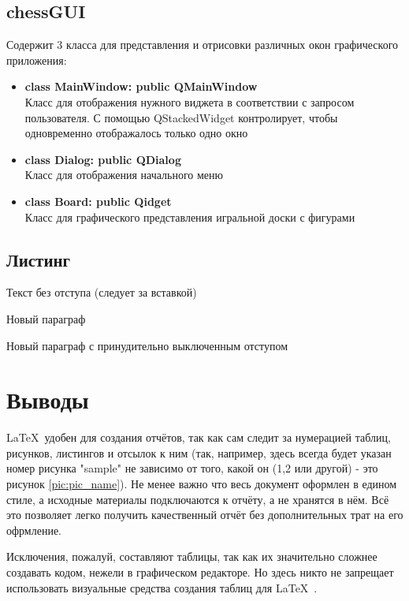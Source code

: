 \subsection*{chessGUI}
Содержит 3 класса для представления и отрисовки различных окон графического приложения:
\begin{itemize}
\item\textbf{class MainWindow: public QMainWindow}\\
Класс для отображения нужного виджета в соответствии с запросом пользователя. С помощью QStackedWidget контролирует, чтобы одновременно отображалось только одно окно\\
\item\textbf{class Dialog: public QDialog}\\
Класс для отображения начального меню\\
\item\textbf{class Board: public Qidget}\\
Класс для графического представления игральной доски с фигурами\\
\end{itemize}


\subsection{Листинг}

%
Текст без отступа (следует за вставкой)

Новый параграф

\noindent Новый параграф с принудительно выключенным отступом



\section{Выводы}
\LaTeX\ удобен для создания отчётов, так как сам следит за нумерацией таблиц, рисунков, листингов и отсылок к ним (так, например, здесь всегда будет указан номер рисунка "sample" не зависимо от того, какой он (1,2 или другой) - это рисунок \ref{pic:pic_name}). Не менее важно что весь документ оформлен в едином стиле, а исходные материалы подключаются к отчёту, а не хранятся в нём. Всё это позволяет легко получить качественный отчёт без дополнительных трат на его офрмление.

Исключения, пожалуй, составляют таблицы, так как их значительно сложнее создавать кодом, нежели в графическом редакторе. Но здесь никто не запрещает использовать визуальные средства создания таблиц для \LaTeX\ .

